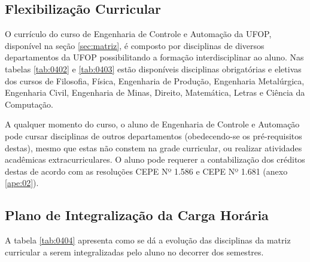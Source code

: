 \subsection*{Flexibilização Curricular}
O currículo do curso de Engenharia de Controle e Automação da UFOP, disponível na seção \ref{sec:matriz}, é composto por disciplinas de diversos departamentos da UFOP possibilitando a formação interdisciplinar ao aluno. Nas tabelas \ref{tab:0402} e \ref{tab:0403} estão disponíveis disciplinas obrigatórias e eletivas dos cursos de Filosofia, Física, Engenharia de Produção, Engenharia Metalúrgica, Engenharia Civil, Engenharia de Minas, Direito, Matemática, Letras e Ciência da Computação. 

A qualquer momento do curso, o aluno de Engenharia de Controle e Automação pode cursar disciplinas de outros departamentos (obedecendo-se os pré-requisitos destas), mesmo que estas não constem na grade curricular, ou realizar atividades acadêmicas extracurriculares. O aluno pode requerer a contabilização dos créditos destas de acordo com as resoluções CEPE  Nº  1.586 e CEPE  Nº  1.681 (anexo \ref{ape:02}).

\subsection{Plano de Integralização da Carga Horária}

A tabela \ref{tab:0404} apresenta como se dá a evolução das disciplinas da matriz curricular a serem integralizadas pelo aluno no decorrer dos semestres.

